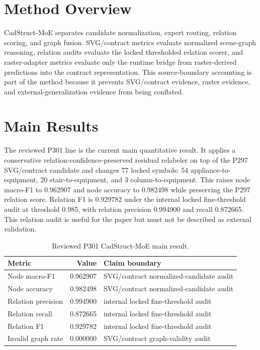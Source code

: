 \documentclass[11pt]{article}
\begin{document}
\section{Method Overview}
CadStruct-MoE separates candidate normalization, expert routing, relation scoring, and graph fusion. SVG/contract metrics evaluate normalized scene-graph reasoning, relation audits evaluate the locked thresholded relation scorer, and raster-adapter metrics evaluate only the runtime bridge from raster-derived predictions into the contract representation. This source-boundary accounting is part of the method because it prevents SVG/contract evidence, raster evidence, and external-generalization evidence from being conflated.

\section{Main Results}
The reviewed P301 line is the current main quantitative result. It applies a conservative relation-confidence-preserved residual relabeler on top of the P297 SVG/contract candidate and changes 77 locked symbols: 54 appliance-to-equipment, 20 stair-to-equipment, and 3 column-to-equipment. This raises node macro-F1 to 0.962907 and node accuracy to 0.982498 while preserving the P297 relation score. Relation F1 is 0.929782 under the internal locked fine-threshold audit at threshold 0.985, with relation precision 0.994900 and recall 0.872665. This relation audit is useful for the paper but must not be described as external validation.

\begin{table}[t]
\centering
\small
\caption{Reviewed P301 CadStruct-MoE main result.}
\label{tab:p301_main_result}
\begin{tabular}{lrl}
\toprule
Metric & Value & Claim boundary \\
\midrule
Node macro-F1 & 0.962907 & SVG/contract normalized-candidate audit \\
Node accuracy & 0.982498 & SVG/contract normalized-candidate audit \\
Relation precision & 0.994900 & internal locked fine-threshold audit \\
Relation recall & 0.872665 & internal locked fine-threshold audit \\
Relation F1 & 0.929782 & internal locked fine-threshold audit \\
Invalid graph rate & 0.000000 & SVG/contract graph-validity audit \\
\bottomrule
\end{tabular}
\end{table}
\end{document}
